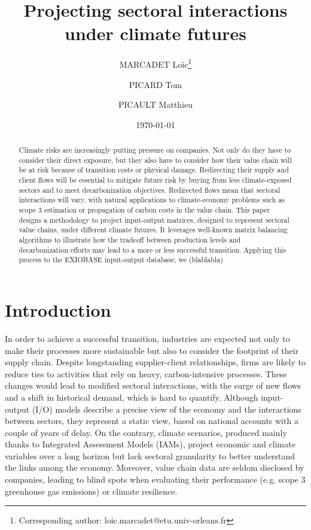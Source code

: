 \documentclass[11pt,a4paper]{article}
\title{Projecting sectoral interactions under climate futures}
\author[1]{MARCADET Loïc\thanks{Corresponding author: loic.marcadet@etu.univ-orleans.fr}}
\author[2]{PICARD Tom}
\author[3]{PICAULT Matthieu}
\affil[1]{Nexialog Consulting, France \& Université d'Orléans (LEO), France}
\affil[2]{Nexialog Consulting, France}
\affil[3]{IÉSEG School of Management, France}
\date{\today}
\begin{document}
\maketitle

\begin{abstract}
Climate risks are increasingly putting pressure on companies. Not only do they have to consider their direct exposure, but they also have to consider how their value chain will be at risk because of transition costs or physical damage. Redirecting their supply and client flows will be essential to mitigate future risk by buying from less climate-exposed sectors and to meet decarbonization objectives.
Redirected flows mean that sectoral interactions will vary, with natural applications to climate-economy problems such as scope 3 estimation or propagation of carbon costs in the value chain. This paper designs a methodology to project input-output matrices, designed to represent sectoral value chains, under different climate futures. It leverages well-known matrix balancing algorithms to illustrate how the tradeoff between production levels and decarbonization efforts may lead to a more or less successful transition. Applying this process to the EXIOBASE input-output database, we (blablabla)
\end{abstract}

\section{Introduction}
\label{sec:intro}


In order to achieve a successful transition, industries are expected not only to make their processes more sustainable but also to consider the footprint of their supply chain. Despite longstanding supplier-client relationships, firms are likely to reduce ties to activities that rely on heavy, carbon-intensive processes. These changes would lead to modified sectoral interactions, with the surge of new flows and a shift in historical demand, which is hard to quantify. Although input-output (I/O) models describe a precise view of the economy and the interactions between sectors, they represent a static view, based on national accounts with a couple of years of delay. On the contrary, climate scenarios, produced mainly thanks to Integrated Assessment Models (IAMs), project economic and climate variables over a long horizon but lack sectoral granularity to better understand the links among the economy. Moreover, value chain data are seldom disclosed by companies, leading to blind spots when evaluating their performance (e.g. scope 3 greenhouse gas emissions) or climate resilience.
\end{document}
